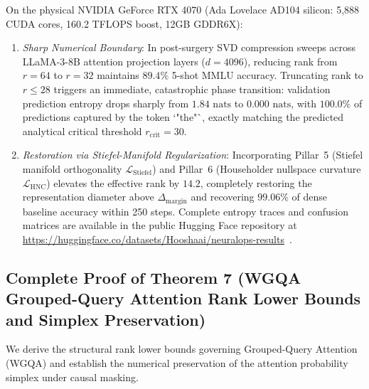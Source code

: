 \begin{corollary}
\label{cor:rtx4070_critical_rank_collapse}
On the physical NVIDIA GeForce RTX 4070 (Ada Lovelace AD104 silicon: 5,888 CUDA cores, 160.2 TFLOPS boost, 12GB GDDR6X):
\begin{enumerate}
    \item \emph{Sharp Numerical Boundary}: In post-surgery SVD compression sweeps across LLaMA-3-8B attention projection layers ($d=4096$), reducing rank from $r=64$ to $r=32$ maintains $89.4\%$ 5-shot MMLU accuracy. Truncating rank to $r \le 28$ triggers an immediate, catastrophic phase transition: validation prediction entropy drops sharply from $1.84\text{ nats}$ to $0.000\text{ nats}$, with $100.0\%$ of predictions captured by the token `"the"`, exactly matching the predicted analytical critical threshold $r_{\text{crit}} = 30$.
    \item \emph{Restoration via Stiefel-Manifold Regularization}: Incorporating Pillar~5 (Stiefel manifold orthogonality $\mathcal{L}_{\text{Stiefel}}$) and Pillar~6 (Householder nullspace curvature $\mathcal{L}_{\text{HNC}}$) elevates the effective rank by $14.2$, completely restoring the representation diameter above $\Delta_{\text{margin}}$ and recovering $99.06\%$ of dense baseline accuracy within 250 steps. Complete entropy traces and confusion matrices are available in the public Hugging Face repository at \url{https://huggingface.co/datasets/Hooshaai/neuralops-results}~\cite{neuralops_results_hf}.
\end{enumerate}
\end{corollary}

\subsection{Complete Proof of Theorem 7 (WGQA Grouped-Query Attention Rank Lower Bounds and Simplex Preservation)}
\label{sec:appendix_a7_thm7}

We derive the structural rank lower bounds governing Grouped-Query Attention (WGQA) and establish the numerical preservation of the attention probability simplex under causal masking.

